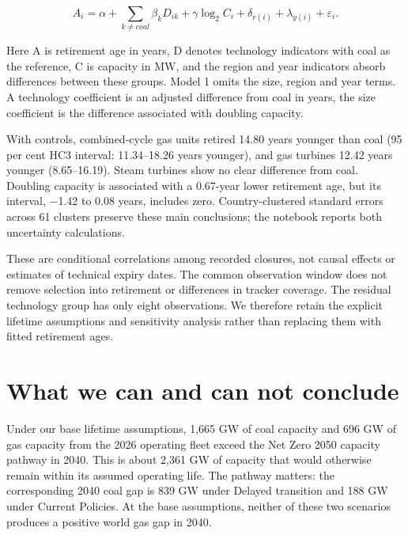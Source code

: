 \documentclass[11pt,a4paper]{article}
\begin{document}
\begin{equation}
A_{i} = \alpha + \sum_{k \neq coal}^{}\beta_{k}D_{ik} + \gamma\log_{2}C_{i} + \delta_{r(i)} + \lambda_{y(i)} + \varepsilon_{i}.
\label{eq:retirement}
\end{equation}

Here A is retirement age in years, D denotes technology indicators with coal as the reference, C is capacity in MW, and the region and year indicators absorb differences between these groups. Model 1 omits the size, region and year terms. A technology coefficient is an adjusted difference from coal in years, the size coefficient is the difference associated with doubling capacity.

\begin{table}[htbp]
\centering\small
\caption{OLS coefficients in years, with HC3 standard errors in parentheses. Technology rows show differences from coal: negative values indicate younger retirement. The capacity row shows the difference associated with doubling MW. Intercept, region and year coefficients are omitted. Source: GEM trackers, July/August 2026; authors\textquotesingle{} calculations.}
\label{tab:econometrics}

\end{table}

With controls, combined-cycle gas units retired 14.80 years younger than coal (95 per cent HC3 interval: 11.34--18.26 years younger), and gas turbines 12.42 years younger (8.65--16.19). Steam turbines show no clear difference from coal. Doubling capacity is associated with a 0.67-year lower retirement age, but its interval, \ensuremath{-}1.42 to 0.08 years, includes zero. Country-clustered standard errors across 61 clusters preserve these main conclusions; the notebook reports both uncertainty calculations.

These are conditional correlations among recorded closures, not causal effects or estimates of technical expiry dates. The common observation window does not remove selection into retirement or differences in tracker coverage. The residual technology group has only eight observations. We therefore retain the explicit lifetime assumptions and sensitivity analysis rather than replacing them with fitted retirement ages.

\section{What we can and can not conclude}

Under our base lifetime assumptions, 1,665 GW of coal capacity and 696 GW of gas capacity from the 2026 operating fleet exceed the Net Zero 2050 capacity pathway in 2040. This is about 2,361 GW of capacity that would otherwise remain within its assumed operating life. The pathway matters: the corresponding 2040 coal gap is 839 GW under Delayed transition and 188 GW under Current Policies. At the base assumptions, neither of these two scenarios produces a positive world gas gap in 2040.
\end{document}
